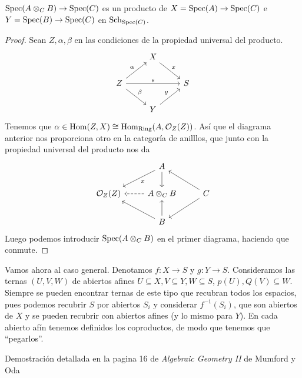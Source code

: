 \documentclass[GA.tex]{subfiles}
\begin{document}
\begin{dem}
\begin{lemma}
$\operatorname{Spec}(A\otimes_C B)\to\operatorname{Spec}(C)$ es un producto de $X=\operatorname{Spec}(A)\to\operatorname{Spec}(C)$ e $Y=\operatorname{Spec}(B)\to\operatorname{Spec}(C)$ en $\mathrm{Sch}_{\operatorname{Spec}(C)}$.
\end{lemma}
\begin{proof}
Sean $Z,\alpha,\beta$ en las condiciones de la propiedad universal del producto. 
\[
\begin{tikzcd}
& X\arrow[dr, "x"]&\\
Z\arrow[ur, "\alpha"]\arrow[rr, "s"]\arrow[dr, "\beta"] &  & S\\
& Y \arrow[ur, "y"]&
\end{tikzcd}
\]
Tenemos que $\alpha\in\operatorname{Hom}(Z,X)\cong\operatorname{Hom}_{\mathrm{Ring}}(A,{\mathcal O}_Z(Z))$. Así que el diagrama anterior nos proporciona otro en la categoría de anilllos, que junto con la propiedad universal del producto nos da
\[
\begin{tikzcd}
& A\arrow[dl, "x"]\arrow[d]&\\
\OO_Z(Z) & A\otimes_C B\arrow[l, dashed] & C\arrow[dl]\arrow[ul]\\
& B \arrow[ul]\arrow[u]&
\end{tikzcd}
\]
Luego podemos introducir $\operatorname{Spec}(A\otimes_C B)$ en el primer diagrama, haciendo que conmute. 

\end{proof}

Vamos ahora al caso general. Denotamos $f:X\to S$ y $g:Y\to S$. Consideramos las ternas $(U,V,W)$ de abiertos afines $U\subseteq X, V\subseteq Y, W\subseteq S$, $p(U),Q(V)\subseteq W$. Siempre se pueden encontrar ternas de este tipo que recubran todos los espacios, pues podemos recubrir $S$ por abiertos $S_i$ y considerar $f^{-1}(S_i)$, que son abiertos de $X$ y se pueden recubrir con abiertos afines (y lo mismo para $Y$). En cada abierto afín tenemos definidos los coproductos, de modo que tenemos que ``pegarlos''. 

Demostración detallada en la pagina 16 de \emph{Algebraic Geometry II} de Mumford y Oda


\end{dem}
\end{document}
